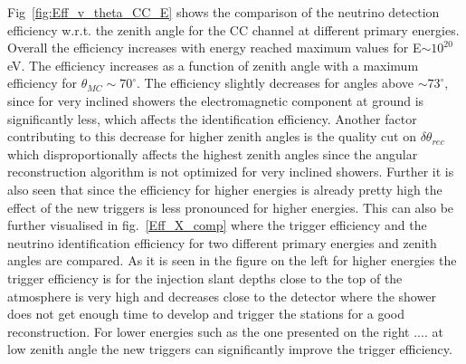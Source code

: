 Fig~\ref{fig:Eff_v_theta_CC_E} shows the comparison of the neutrino detection efficiency w.r.t. the zenith angle for the CC channel at different primary energies. Overall the efficiency increases with energy reached maximum values for E$\sim 10^{20}$eV. The efficiency increases as a function of zenith angle with a maximum efficiency for $\theta_{MC} \sim 70^{\circ}$. The efficiency slightly decreases for angles above $ \sim 73^{\circ}$, since for very inclined showers the electromagnetic component at ground is significantly less, which affects the identification efficiency. Another factor contributing to this decrease for higher zenith angles is the quality cut on $\delta \theta_{rec}$ which disproportionally affects the highest zenith angles since the angular reconstruction algorithm is not optimized for very inclined showers. Further it is also seen that since the efficiency for higher energies is already pretty high the effect of the new triggers is less pronounced for higher energies. This can also be further visualised in fig.~\ref{Eff_X_comp} where the trigger efficiency and the neutrino identification efficiency for two different primary energies and zenith angles are compared. As it is seen in the figure on the left for higher energies the trigger efficiency is for the injection slant depths close to the top of the atmosphere is very high and decreases close to the detector where the shower does not get enough time to develop and trigger the stations for a good reconstruction. For lower energies  such as the one presented on the right .... at low zenith angle the new triggers can significantly improve the trigger efficiency. 


